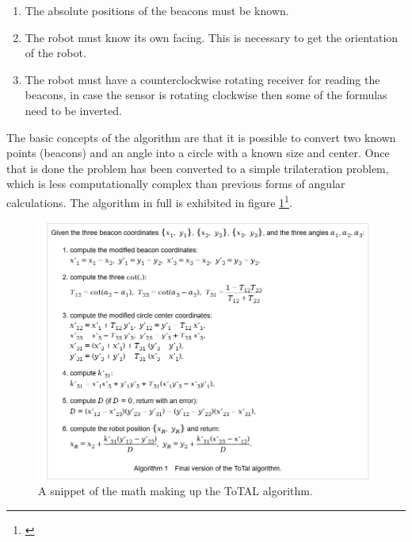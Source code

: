 \begin{enumerate}
\item The absolute positions of the beacons must be known. 
\item The robot must know its own facing. This is necessary to get the orientation of the robot. 
\item The robot must have a counterclockwise rotating receiver for reading the beacons, in case the sensor is rotating clockwise then some of the formulas need to be inverted.
\end{enumerate}

The basic concepts of the algorithm are that it is possible to convert two known points (beacons) and an angle into a circle with a known size and center. Once that is done the problem has been converted to a simple trilateration problem, which is less computationally complex than previous forms of angular calculations. The algorithm in full is exhibited in figure \ref{fig:totalalgdrawing}\footnote{\cite{VincentPierlot2001}}.

\begin{figure}[H]
    \centering
    \includegraphics[width=0.7\linewidth]{positioning/positioning/ToTalAlgorithm}
    \caption{A snippet of the math making up the ToTAL algorithm.}
    \label{fig:totalalgdrawing}
\end{figure}
